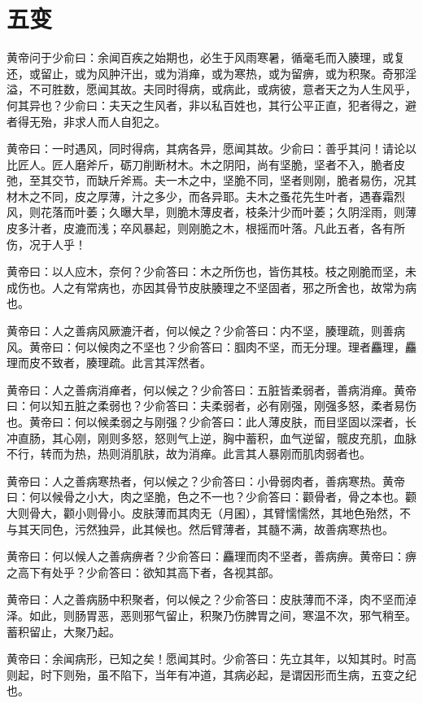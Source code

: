 \documentclass[12pt,UTF8]{ctexbook}
\begin{document}
	\chapter{五变}
	
	黄帝问于少俞曰：余闻百疾之始期也，必生于风雨寒暑，循毫毛而入腠理，或复还，或留止，或为风肿汗出，或为消瘅，或为寒热，或为留痹，或为积聚。奇邪淫溢，不可胜数，愿闻其故。夫同时得病，或病此，或病彼，意者天之为人生风乎，何其异也？少俞曰：夫天之生风者，非以私百姓也，其行公平正直，犯者得之，避者得无殆，非求人而人自犯之。
	
	黄帝曰：一时遇风，同时得病，其病各异，愿闻其故。少俞曰：善乎其问！请论以比匠人。匠人磨斧斤，砺刀削断材木。木之阴阳，尚有坚脆，坚者不入，脆者皮弛，至其交节，而缺斤斧焉。夫一木之中，坚脆不同，坚者则刚，脆者易伤，况其材木之不同，皮之厚薄，汁之多少，而各异耶。夫木之蚤花先生叶者，遇春霜烈风，则花落而叶萎；久曝大旱，则脆木薄皮者，枝条汁少而叶萎；久阴淫雨，则薄皮多汁者，皮漉而浅；卒风暴起，则刚脆之木，根摇而叶落。凡此五者，各有所伤，况于人乎！
	
	黄帝曰：以人应木，奈何？少俞答曰：木之所伤也，皆伤其枝。枝之刚脆而坚，未成伤也。人之有常病也，亦因其骨节皮肤腠理之不坚固者，邪之所舍也，故常为病也。
	
	黄帝曰：人之善病风厥漉汗者，何以候之？少俞答曰：内不坚，腠理疏，则善病风。黄帝曰：何以候肉之不坚也？少俞答曰：腘肉不坚，而无分理。理者麤理，麤理而皮不致者，腠理疏。此言其浑然者。
	
	黄帝曰：人之善病消瘅者，何以候之？少俞答曰：五脏皆柔弱者，善病消瘅。黄帝曰：何以知五脏之柔弱也？少俞答曰：夫柔弱者，必有刚强，刚强多怒，柔者易伤也。黄帝曰：何以候柔弱之与刚强？少俞答曰：此人薄皮肤，而目坚固以深者，长冲直肠，其心刚，刚则多怒，怒则气上逆，胸中蓄积，血气逆留，髋皮充肌，血脉不行，转而为热，热则消肌肤，故为消瘅。此言其人暴刚而肌肉弱者也。
	
	黄帝曰：人之善病寒热者，何以候之？少俞答曰：小骨弱肉者，善病寒热。黄帝曰：何以候骨之小大，肉之坚脆，色之不一也？少俞答曰：颧骨者，骨之本也。颧大则骨大，颧小则骨小。皮肤薄而其肉无（月囷），其臂懦懦然，其地色殆然，不与其天同色，污然独异，此其候也。然后臂薄者，其髓不满，故善病寒热也。
	
	黄帝曰：何以候人之善病痹者？少俞答曰：麤理而肉不坚者，善病痹。黄帝曰：痹之高下有处乎？少俞答曰：欲知其高下者，各视其部。
	
	黄帝曰：人之善病肠中积聚者，何以候之？少俞答曰：皮肤薄而不泽，肉不坚而淖泽。如此，则肠胃恶，恶则邪气留止，积聚乃伤脾胃之间，寒温不次，邪气稍至。蓄积留止，大聚乃起。
	
	黄帝曰：余闻病形，已知之矣！愿闻其时。少俞答曰：先立其年，以知其时。时高则起，时下则殆，虽不陷下，当年有冲道，其病必起，是谓因形而生病，五变之纪也。
\end{document}
